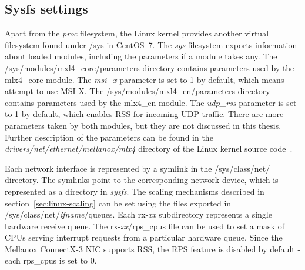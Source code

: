 
\subsection{Sysfs settings}\label{subsec:analysis-settings-sysfs}
Apart from the {\it{proc}} filesystem, the Linux kernel provides another virtual filesystem found under /sys in CentOS~7.
The {\it{sys}} filesystem exports information about loaded modules, including the parameters if a module takes any.
The /sys/modules/mxl4\_core/parameters directory contains parameters used by the mlx4\_core module.
The {\it{msi\_x}} parameter is set to 1 by default, which means attempt to use MSI-X.
The /sys/modules/mxl4\_en/parameters directory contains parameters used by the mlx4\_en module.
The {\it{udp\_rss}} parameter is set to 1 by default, which enables RSS for incoming UDP traffic.
There are more parameters taken by both modules, but they are not discussed in this thesis.
Further description of the parameters can be found
in the {\it{drivers/net/ethernet/mellanox/mlx4}} directory of the Linux kernel source code~\cite{kernel-source}.

Each network interface is represented by a symlink in the /sys/class/net/ directory.
The symlinks point to the corresponding network device, which is represented as a directory in {\it{sysfs}}.
The scaling mechanisms described in section~\ref{sec:linux-scaling} can be set
using the files exported in /sys/class/net/{\it{ifname}}/queues.
Each rx-{\it{xx}} subdirectory represents a single hardware receive queue.
The rx-{\it{xx}}/rps\_cpus file can be used to set a mask of CPUs serving interrupt requests from a particular hardware queue.
Since the Mellanox ConnectX-3 NIC supports RSS, the RPS feature is disabled by default - each rps\_cpus is set to 0.

